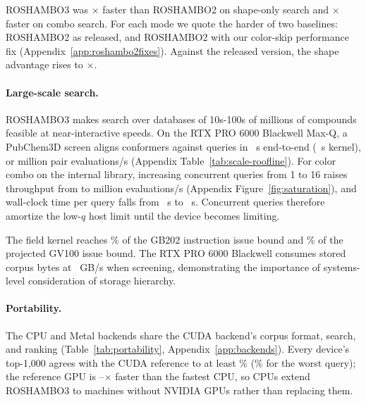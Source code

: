 \documentclass{article}
\begin{document}
ROSHAMBO3 was \VoltaShapeCorrectedSpeedup$\times$ faster than ROSHAMBO2 on shape-only search and \VoltaComboStockSpeedup$\times$ faster on combo search. For each mode we quote the harder of two baselines: ROSHAMBO2 as released, and ROSHAMBO2 with our color-skip performance fix (Appendix~\ref{app:roshambo2fixes}). Against the released version, the shape advantage rises to \VoltaShapeStockSpeedup$\times$.



\paragraph{Large-scale search.} ROSHAMBO3 makes search over databases
of 10s-100s of millions of compounds feasible at near-interactive speeds.
On the RTX PRO 6000 Blackwell Max-Q, a PubChem3D screen aligns \DfiveConformers{}
conformers against \DfiveQueries{} queries in \DfiveWallSeconds~s end-to-end
(\DfiveKernelSeconds~s kernel), or \DfiveMillionEvaluationsPerSecond{} million
pair evaluations/s (Appendix Table~\ref{tab:scale-roofline}). For color combo on the internal library, increasing concurrent queries from 1 to 16 raises
throughput from \ComboQOneMillionEvaluationsPerSecond{} to
\ComboQSixteenMillionEvaluationsPerSecond{} million evaluations/s (Appendix Figure~\ref{fig:saturation}), and wall-clock time per query falls from
\ThreeCrQOneWallSecondsWhole~s to \ComboQSixteenWallSecondsPerQueryWhole~s. Concurrent queries therefore amortize the low-$q$ host limit until the device becomes limiting.

The field kernel reaches \RooflineBlackwellKernelToStructuralPercent\% of the  GB202 instruction issue bound and
\RooflineTitanKernelToStructuralPercent\% of the projected GV100 issue bound. The RTX PRO 6000 Blackwell consumes stored corpus bytes at
\PubchemStoredGigabytesPerSecond~GB/s when screening, demonstrating the importance of systems-level consideration of storage hierarchy. 


\paragraph{Portability.} The CPU and Metal backends share the CUDA backend's
corpus format, search, and ranking (Table~\ref{tab:portability},
Appendix~\ref{app:backends}). Every device's top-1,000 agrees with the CUDA
reference to at least \PortabilityLowestMeanRecallPercent\%
(\PortabilityWorstRecallPercent\% for the worst query); the reference GPU is
\PortabilityReferenceOverFastestCpuLow--\PortabilityReferenceOverFastestCpuHigh$\times$
faster than the fastest CPU, so CPUs extend ROSHAMBO3 to machines without NVIDIA
GPUs rather than replacing them.
\end{document}
